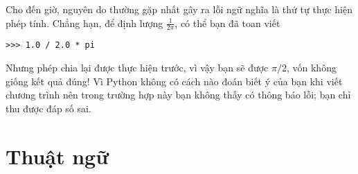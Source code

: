 \documentclass[11pt]{book}
\begin{document}

Cho đến giờ, nguyên do thường gặp nhất gây ra lỗi ngữ nghĩa là
thứ tự thực hiện phép tính. Chẳng hạn, để định lượng $\frac{1}{2 \pi}$,
có thể bạn đã toan viết

\beforeverb
\begin{verbatim}
>>> 1.0 / 2.0 * pi
\end{verbatim}
\afterverb
%
Nhưng phép chia lại được thực hiện trước, vì vậy bạn sẽ được $\pi / 2$,
vốn không giống kết quả đúng! Vì Python không có cách nào đoán biết ý
của bạn khi viết chương trình nên trong trường hợp này bạn không thấy
có thông báo lỗi; bạn chỉ thu được đáp số sai.



\section{Thuật ngữ}
\end{document}
